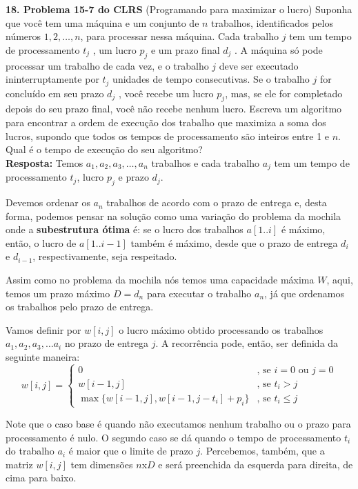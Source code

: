 
\noindent \textbf{18. Problema 15-7 do CLRS} (Programando para maximizar o lucro) Suponha que você tem uma máquina e um conjunto de $n$ trabalhos, identificados pelos números $1, 2, \ldots, n$, para processar nessa máquina. Cada trabalho $j$ tem um tempo de processamento $t_j$ , um lucro $p_j$ e um prazo final $d_j$ . A máquina só pode processar um trabalho de cada vez, e o trabalho $j$ deve ser executado ininterruptamente por $t_j$ unidades de tempo consecutivas. Se o trabalho $j$ for concluído em seu prazo $d_j$ , você recebe um lucro $p_j$, mas, se ele for completado depois do seu prazo final, você não recebe nenhum lucro. Escreva um algoritmo para encontrar a ordem de execução dos trabalho que maximiza a soma dos lucros, supondo que todos os tempos de processamento são inteiros entre 1 e $n$. Qual é o tempo de execução do seu algoritmo?\\[6pt]
\textbf{Resposta:} Temos $a_1, a_2, a_3, \ldots, a_n$ trabalhos e cada trabalho $a_j$ tem um tempo de processamento $t_j$, lucro $p_j$ e prazo $d_j$.

Devemos ordenar os $a_n$ trabalhos de acordo com o prazo de entrega e, desta forma, podemos pensar na solução como uma variação do problema da mochila onde a \textbf{subestrutura ótima} é: se o lucro dos trabalhos $a[1..i]$ é máximo, então, o lucro de $a[1..i-1]$ também é máximo, desde que o prazo de entrega $d_i$ e $d_{i-1}$, respectivamente, seja respeitado.

Assim como no problema da mochila nós temos uma capacidade máxima $W$, aqui, temos um prazo máximo $D = d_n$ para executar o trabalho $a_n$, já que ordenamos os trabalhos pelo prazo de entrega.

Vamos definir por $w[i, j]$ o lucro máximo obtido processando os trabalhos $a_1, a_2, a_3, \ldots a_i$ no prazo de entrega $j$. A recorrência pode, então, ser definida da seguinte maneira:
\begin{equation*}
    w[i, j] =
    \begin{cases}
        0 & \text{, se } i = 0 \text{ ou } j = 0 \\
        w[i-1, j] & \text{, se } t_i > j \\
        \max \{w[i-1, j], w[i-1, j-t_i] + p_i\} & \text{, se } t_i \leq j
    \end{cases}
\end{equation*}

Note que o caso base é quando não executamos nenhum trabalho ou o prazo para processamento é nulo. O segundo caso se dá quando o tempo de processamento $t_i$ do trabalho $a_i$ é maior que o limite de prazo $j$. Percebemos, também, que a matriz $w[i, j]$ tem dimensões $n$x$D$ e será preenchida da esquerda para direita, de cima para baixo.

